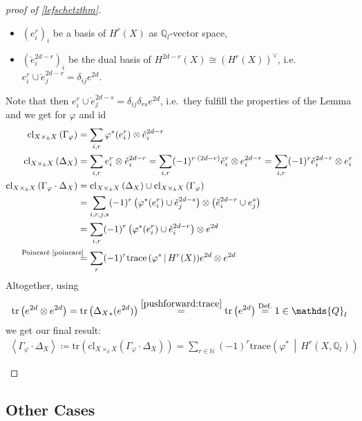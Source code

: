 \documentclass[english]{scrartcl}
\theoremstyle{definition}
\theoremstyle{remark}
\newcommand*{\N}{\mathds{N}}
\newcommand*{\Z}{\mathds{Z}}
\newcommand*{\Q}{\mathds{Q}}
\newcommand*{\Zl}{\Z_l} %
\newcommand*{\Ql}{\Q_l} %
\newcommand*{\id}{\text{id}} %
\newcommand*{\idest}{i.e.\ }
\newcommand*{\tr}[1]{\text{tr}\left(#1\right)} %
\newcommand*{\intProd}[2]{{#1\cdot#2}} %
\newcommand*{\intNum}[1]{{\left\langle{#1}\right\rangle}} %
\newcommand*{\Graph}[1]{{\Gamma_{#1}}} %
\newcommand*{\Diag}[1]{{\Delta_{#1}}} %
\newcommand*{\trace}[2]{{\text{trace}\left(#1 \,\middle|\, #2 \right)}} %
\newcommand*{\cl}[2]{{\text{cl}_{#1}\left(#2\right)}} %
\renewcommand*{\phi}{\varphi}
\newcommand*{\Poincare}{{\text{Poincaré \ref{poincare}}}}
\begin{document}
\begin{proof}[proof of \autoref{lefschetzthm}]
\begin{enumerate}[label={Step \arabic*.}]
  \begin{itemize}
  \item $(e_i^r)_{i}$ be a basis of $H^r(X)$ as $\Ql$-vector space,
  \item $(\check e_i^{2d-r})_{i}$ be the dual basis of $H^{2d-r}(X)\cong (H^{r}(X))^\vee$,
    \idest $e^r_i\cup \check e_j^{2d-r}= \delta_{ij}e^{2d}$.
  \end{itemize}
  Note that then $e^r_i\cup \check e_j^{2d-s}=\delta_{ij}\delta_{rs}e^{2d}$,
  \idest they fulfill the properties of the Lemma
  and we get for $\phi$ and $\id$
  \begin{align*}
    \cl{X\times_k X}{\Graph{\phi}}
    &= \sum_{i,r} \phi^*(e_i^r)\otimes \check e_i^{2d-r}\\
    \cl{X\times_k X}{\Diag{X}}
    &= \sum_{i,r} e_i^r\otimes \check e_i^{2d-r} =
      \sum_{i,r} (-1)^{r\cdot (2d-r)}\check e_i^r\otimes e_i^{2d-r} =
      \sum_{i,r} (-1)^{r}\check e_i^{2d-r}\otimes e_i^r\\
    \cl{X\times_k X}{\intProd{\Graph{\phi}}{\Diag{X}}}
    &= \cl{X\times_k X}{\Diag{X}} \cup \cl{X\times_k X}{\Graph{\phi}}\\
    &= \sum_{i,r,j,s} (-1)^{r}
      \left(\phi^*(e_i^r)\cup \check e_j^{2d-s}\right)
      \otimes \left(\check e_i^{2d-r}\cup e_j^s\right)\\
    &= \sum_{i,r} (-1)^{r}
      \left(\phi^*(e_i^r)\cup \check e_i^{2d-r}\right)
      \otimes e^{2d}\\
    &\overset{\mathllap{\Poincare}}=
      \sum_{r} (-1)^r \trace{\phi^*}{H^r(X)} e^{2d} \otimes e^{2d}
  \end{align*}
  Altogether, using
  \begin{align*}
    \tr{e^{2d} \otimes e^{2d}}
    = \tr{\Diag{X}_*(e^{2d})}
    \overset{\eqref{pushforward:trace}}= \tr{e^{2d}}
    \overset{\text{Def.}}= 1\in\Ql
  \end{align*}
  we get our final result:
  \begin{gather*}
    \intNum{\intProd{\Graph\phi}{\Diag X}} \coloneqq
    \tr{\cl{X\times_kX}{\intProd{\Graph\phi}{\Diag X}}}
    = \sum_{r\in\N} (-1)^r \trace{\phi^*}{H^r(X,\Ql)}
  \end{gather*}
\end{enumerate}
\end{proof}

\subsection{Other Cases}

\nocite{*}
\printbibliography
\end{document}
